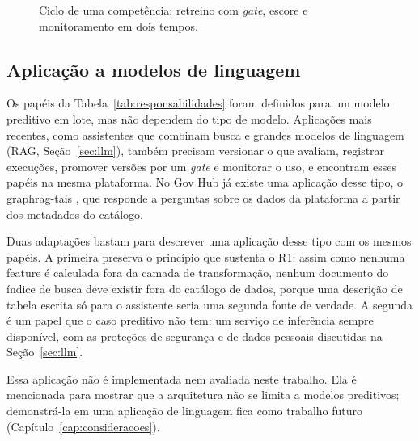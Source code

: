 \begin{figure}[htbp]
{%
	}
	\caption{Ciclo de uma competência: retreino com \textit{gate}, escore e monitoramento em dois tempos.}
	\label{fig:operacao}
\end{figure}

\subsection{Aplicação a modelos de linguagem}
\label{sec:extensao-llm}

Os papéis da Tabela~\ref{tab:responsabilidades} foram definidos para um modelo preditivo em lote, mas não dependem do tipo de modelo. Aplicações mais recentes, como assistentes que combinam busca e grandes modelos de linguagem (RAG, Seção~\ref{sec:llm}), também precisam versionar o que avaliam, registrar execuções, promover versões por um \textit{gate} e monitorar o uso, e encontram esses papéis na mesma plataforma. No Gov Hub já existe uma aplicação desse tipo, o graphrag-tais \cite{graphragtais}, que responde a perguntas sobre os dados da plataforma a partir dos metadados do catálogo.

Duas adaptações bastam para descrever uma aplicação desse tipo com os mesmos papéis. A primeira preserva o princípio que sustenta o R1: assim como nenhuma feature é calculada fora da camada de transformação, nenhum documento do índice de busca deve existir fora do catálogo de dados, porque uma descrição de tabela escrita só para o assistente seria uma segunda fonte de verdade. A segunda é um papel que o caso preditivo não tem: um serviço de inferência sempre disponível, com as proteções de segurança e de dados pessoais discutidas na Seção~\ref{sec:llm}.

Essa aplicação não é implementada nem avaliada neste trabalho. Ela é mencionada para mostrar que a arquitetura não se limita a modelos preditivos; demonstrá-la em uma aplicação de linguagem fica como trabalho futuro (Capítulo~\ref{cap:consideracoes}).

